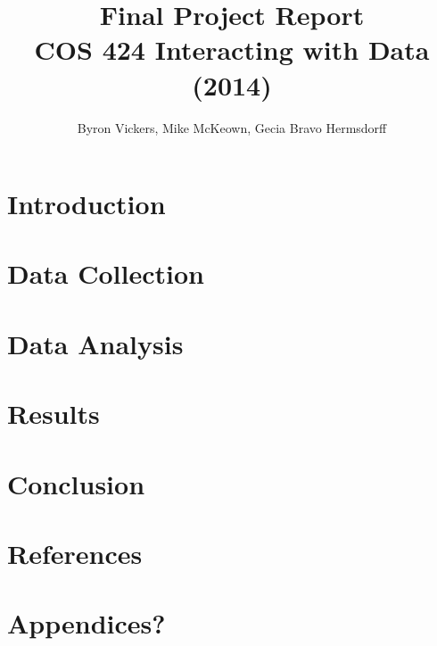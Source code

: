 \documentclass[10pt]{article}
\author{Byron Vickers, Mike McKeown, Gecia Bravo Hermsdorff}
\title{Final Project Report \\ {\Large COS 424 Interacting with Data (2014)} }
\date{}
\begin{document}
\maketitle

\section{Introduction}


\section{Data Collection}


\section{Data Analysis}


\section{Results}


\section{Conclusion}


\section{References}


\section{Appendices?}
\end{document}
